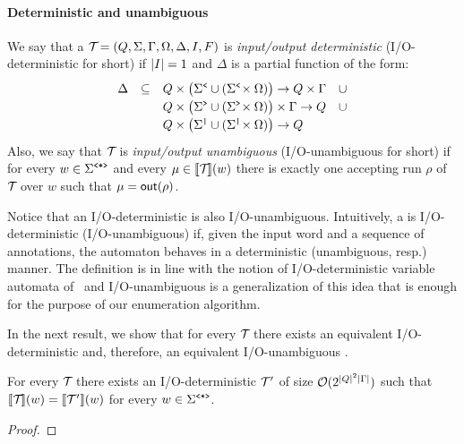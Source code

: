 \paragraph{Deterministic and unambiguous \vpannnames}
We say that a \vpann $\mathcal{T}\! = (Q, \Sigma, \Gamma, \Omega, \Delta, I, F)$ is \emph{input/output deterministic} (I/O-deterministic for short)
 if $|I| = 1$ and $\Delta$ is a partial function of the form:
$$
\renewcommand{\arraystretch}{1.2}
\begin{array}{rcl}
	\Delta & \subseteq & 
	Q \times \big(\opS \cup (\opS \!\times \oalph)\big) \to Q \times \Gamma \ \ \ \cup \\
	& & Q \times \big(\clS  \cup  (\clS \!\times \oalph)\big) \times \Gamma \to Q \ \ \ \cup  \\
	& & Q \times \big(\noS  \cup  (\noS \!\times \oalph)\big) \to Q
\end{array}
$$
Also, we say that $\mathcal{T}\!$ is \emph{input/output unambiguous} (I/O-unambiguous for short) if for every $w\in \Sigma^{\texttt{<*>}}$ and every $\mu \in {\llbracket{\mathcal{T}\!}\rrbracket}(w)$ there is exactly one accepting run $\rho$ of $\mathcal{T}\!$ over $w$ such that $\mu = \textsf{out}(\rho)$. 

Notice that an I/O-deterministic \vpann is also I/O-unambiguous. 
Intuitively, a \vpann is I/O-deterministic (I/O-unambiguous) if, given the input word and a sequence of annotations, the automaton behaves in a deterministic (unambiguous, resp.) manner. 
The definition is in line with the notion of I/O-deterministic variable automata of~\cite{FlorenzanoRUVV20} and I/O-unambiguous is a generalization of this idea that is enough for the purpose of our enumeration algorithm. 

In the next result, we show that for every \vpann $\mathcal{T}\!$ there exists an equivalent I/O-deterministic \vpann and, therefore, an equivalent I/O-unambiguous \vpann. 

\begin{proposition} \label{nested:vpawo:det}
	For every \vpann $\mathcal{T}\!$ there exists an I/O-deterministic \vpann $\mathcal{T}\!\,'$ of size $\mathcal{O}(2^{|Q|^2|\Gamma|})$ such that $\llbracket \mathcal{T}\! \rrbracket(w) = \llbracket \mathcal{T}\!\,' \rrbracket(w)$ for every $w\in\Sigma^{\texttt{<*>}}$.
\end{proposition}
\begin{proof}
	
\end{proof}

